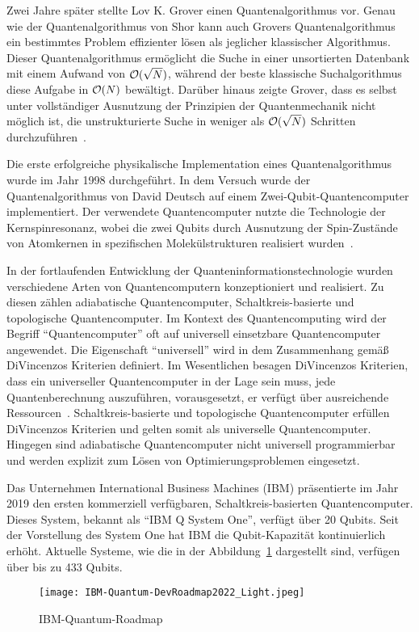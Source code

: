 Zwei Jahre später stellte Lov K. Grover einen Quantenalgorithmus vor.
Genau wie der Quantenalgorithmus von Shor kann auch Grovers Quantenalgorithmus ein bestimmtes Problem effizienter lösen als jeglicher klassischer Algorithmus.
Dieser Quantenalgorithmus ermöglicht die Suche in einer unsortierten Datenbank mit einem Aufwand von \(\operatorname{\mathcal{O}}(\sqrt N)\), 
während der beste klassische Suchalgorithmus diese Aufgabe in \(\operatorname{\mathcal{O}}(N)\) bewältigt. 
Darüber hinaus zeigte Grover, 
dass es selbst unter vollständiger Ausnutzung der Prinzipien der Quantenmechanik nicht möglich ist, 
die unstrukturierte Suche in weniger als \(\operatorname{\mathcal{O}}(\sqrt N)\) Schritten durchzuführen~\cite{grover1996fast}.

Die erste erfolgreiche physikalische Implementation eines Quantenalgorithmus wurde im Jahr 1998 durchgeführt.
In dem Versuch wurde der Quantenalgorithmus von David Deutsch auf einem Zwei-Qubit-Quantencomputer implementiert.
Der verwendete Quantencomputer nutzte die Technologie der Kernspinresonanz, 
wobei die zwei Qubits durch Ausnutzung der Spin-Zustände von Atomkernen in spezifischen Molekülstrukturen realisiert wurden~\cite{Jones_1998}.

In der fortlaufenden Entwicklung der Quanteninformationstechnologie wurden verschiedene Arten von Quantencomputern konzeptioniert und realisiert.
Zu diesen zählen adiabatische Quantencomputer, Schaltkreis-basierte und topologische Quantencomputer.
Im Kontext des Quantencomputing wird der Begriff "`Quantencomputer"' oft auf universell einsetzbare Quantencomputer angewendet.
Die Eigenschaft "`universell"' wird in dem Zusammenhang gemäß DiVincenzos Kriterien definiert. 
Im Wesentlichen besagen DiVincenzos Kriterien, dass ein universeller Quantencomputer in der Lage sein muss, jede Quantenberechnung auszuführen, vorausgesetzt, er verfügt über ausreichende Ressourcen~\cite{DiVincenzo_2000}.
Schaltkreis-basierte und topologische Quantencomputer erfüllen DiVincenzos Kriterien und gelten somit als universelle Quantencomputer.
Hingegen sind adiabatische Quantencomputer nicht universell programmierbar und werden explizit zum Lösen von Optimierungsproblemen eingesetzt.

Das Unternehmen International Business Machines (IBM) präsentierte im Jahr 2019 den ersten kommerziell verfügbaren, Schaltkreis-basierten Quantencomputer.
Dieses System, bekannt als "`IBM Q System One"', verfügt über 20 Qubits.
Seit der Vorstellung des System One hat IBM die Qubit-Kapazität kontinuierlich erhöht. 
Aktuelle Systeme, wie die in der Abbildung~\ref{fig:IBM-Quantum-DevRoadmap2022} dargestellt sind, verfügen über bis zu 433 Qubits.
\begin{figure}[H]
    \centering
    \texttt{[image: IBM-Quantum-DevRoadmap2022\_Light.jpeg]}
    \caption{IBM-Quantum-Roadmap~\cite{IBM_2023}}
    \label{fig:IBM-Quantum-DevRoadmap2022}
\end{figure}

